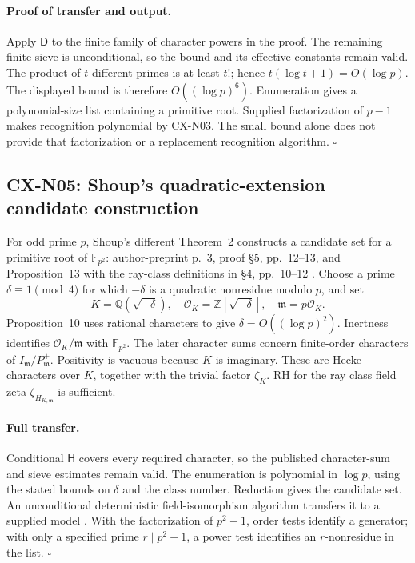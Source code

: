 \paragraph{Proof of transfer and output.}
Apply \(\mathsf D\) to the finite family of character powers in the proof.
The remaining finite sieve is unconditional, so the bound and its
effective constants remain valid. The product of \(t\) different primes
is at least \(t!\); hence \(t(\log t+1)=O(\log p)\). The displayed bound is
therefore \(O((\log p)^6)\). Enumeration gives a polynomial-size list
containing a primitive root. Supplied factorization of \(p-1\) makes
recognition polynomial by CX-N03. The small bound alone does not provide
that factorization or a replacement recognition algorithm. \(\square\)

\subsection{CX-N05: Shoup's quadratic-extension candidate construction}
\label{cx-n05}

For odd prime \(p\), Shoup's different Theorem~2 constructs a candidate set for a primitive
root of \(\mathbb F_{p^2}\): author-preprint p.~3, proof \S5, pp.~12--13,
and Proposition~13 with the ray-class definitions in \S4, pp.~10--12
\cite{CXNShoup92}. Choose a prime \(\delta\equiv1\pmod4\) for which
\(-\delta\) is a quadratic nonresidue modulo \(p\), and set
\[
 K=\mathbb Q(\sqrt{-\delta}),\quad
 \mathcal O_K=\mathbb Z[\sqrt{-\delta}],\quad
 \mathfrak m=p\mathcal O_K .
\]
Proposition~10 uses rational characters to give
\(\delta=O((\log p)^2)\). Inertness identifies
\(\mathcal O_K/\mathfrak m\) with \(\mathbb F_{p^2}\).
The later character sums concern finite-order characters of
\(I_{\mathfrak m}/P_{\mathfrak m}^{+}\). Positivity is vacuous because
\(K\) is imaginary. These are Hecke characters over \(K\), together with
the trivial factor \(\zeta_K\). RH for the ray class field zeta
\(\zeta_{H_{K,\mathfrak m}}\) is sufficient.

\paragraph{Full transfer.}
Conditional \(\mathsf H\) covers every required character, so the
published character-sum and sieve estimates remain valid. The enumeration
is polynomial in \(\log p\), using the stated bounds on \(\delta\) and
the class number. Reduction gives the candidate set. An unconditional
deterministic field-isomorphism algorithm transfers it to a supplied
model \cite[Theorem~(1.2), p.~330]{CXNLenstra91}. With the factorization of \(p^2-1\), order tests identify a
generator; with only a specified prime \(r\mid p^2-1\), a power test
identifies an \(r\)-nonresidue in the list. \(\square\)

